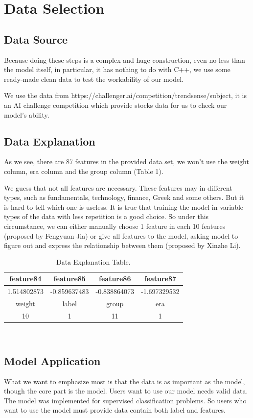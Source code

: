 \documentclass[a4paper]{article}
\begin{document}
\section{Data Selection}
\label{sec:theory}

\subsection{Data Source}
Because doing these steps is a complex and huge construction, even no less than the model itself, in particular, it has nothing to do with C++, we use some ready-made clean data to test the workability of our model. 


We use the data from https://challenger.ai/competition/trendsense/subject, it is an AI challenge competition which provide stocks data for us to check our model’s ability.

\subsection{Data Explanation}

As we see, there are 87 features in the provided data set, we won’t use the weight column, era column and the group column (Table 1). 

We guess that not all features are necessary. These features may in different types, such as fundamentals, technology, finance, Greek and some others. But it is hard to tell which one is useless. It is true that training the model in variable types of the data with less repetition is a good choice. So under this circumstance, we can either manually choose 1 feature in each 10 features (proposed by Fengyuan Jia) or give all features to the model, asking model to figure out and express the relationship between them (proposed by Xinzhe Li).    
\begin{table}
\centering
\begin{tabular}{|c|c|c|c|}
 \hline
feature84& feature85& feature86& feature87 \\
 \hline
1.514802873 & -0.859637483 & -0.838864073 &-1.697329532  \\
 \hline
weight& label& group& era\\
  \hline
10 & 1&11&1\\
\hline
\end{tabular}\\
\caption{\label{tab:widgets}Data Explanation Table.}
\end{table}

\subsection{Model Application}
What we want to emphasize most is that the data is as important as the model, though the core part is the model. Users want to use our model needs valid data. The model was implemented for supervised classification problems. So users who want to use the model must provide data contain both label and features. 
\end{document}
